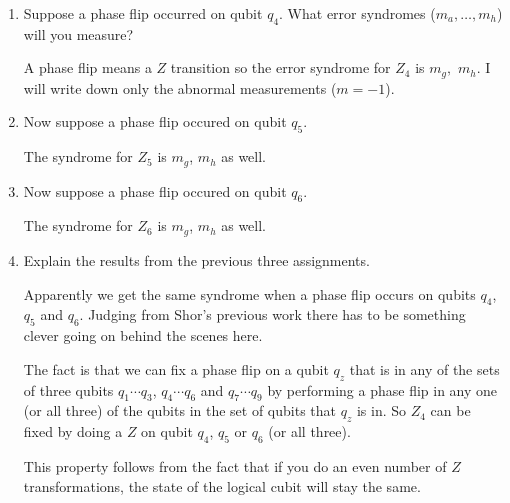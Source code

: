 \documentclass[12pt]{article}
\newenvironment{answer}{\begingroup\setlength{\leftskip}{-\leftmargin}\begin{framed}}{\end{framed}\endgroup}
\begin{document}
\begin{enumerate}
    \item Suppose a phase flip occurred on qubit $q_4$. What error syndromes ($m_a, \dots, m_h$) will you measure?

    \begin{answer}
        A phase flip means a $Z$ transition so the error syndrome for $Z_4$ is $m_g,$ $m_h$. I will write down only the abnormal measurements ($m = -1$).
    \end{answer}

    \item Now suppose a phase flip occured on qubit $q_5$.

    \begin{answer}
        The syndrome for $Z_5$ is $m_g$, $m_h$ as well.
    \end{answer}

    \item Now suppose a phase flip occured on qubit $q_6$.

    \begin{answer}
        The syndrome for $Z_6$ is $m_g$, $m_h$ as well.
    \end{answer}

    \item Explain the results from the previous three assignments.

    \begin{answer}
        Apparently we get the same syndrome when a phase flip occurs on qubits $q_4$, $q_5$ and $q_6$. Judging from Shor's previous work there has to be something clever going on behind the scenes here.

        The fact is that we can fix a phase flip on a qubit $q_z$ that is in any of the sets of three qubits $q_1 \cdots q_3$, $q_4 \cdots q_6$ and $q_7 \cdots q_9$ by performing a phase flip in any one (or all three) of the qubits in the set of qubits that $q_z$ is in. So $Z_4$ can be fixed by doing a $Z$ on qubit $q_4$, $q_5$ or $q_6$ (or all three).

        This property follows from the fact that if you do an even number of $Z$ transformations, the state of the logical cubit will stay the same.


\end{answer}
\end{enumerate}
\end{document}
